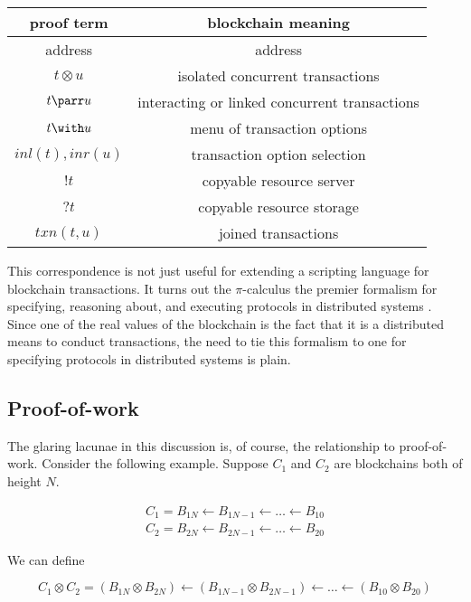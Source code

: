 \documentclass[]{acm_proc_article-sp}
\numberwithin{equation}{subsection}
\begin{document}
\begin{tabular}{c|c}
  proof term & blockchain meaning \\
  \hline
  address & address \\
  $t \otimes u$ & isolated concurrent transactions \\
  $t \parr u$ & interacting or linked concurrent transactions \\
  $t \with u$ & menu of transaction options \\
  $inl( t ), inr( u )$ & transaction option selection \\
  $!t$ & copyable resource server \\
  $?t$ & copyable resource storage \\
  $txn( t, u )$ & joined transactions\\
\end{tabular}

This correspondence is not just useful for extending a scripting
language for blockchain transactions. It turns out the
{$\pi$}-calculus the premier formalism for specifying, reasoning
about, and executing protocols in distributed systems
\cite{milner91polyadicpi} \cite{DBLP:journals/mscs/Milner92}
\cite{DBLP:conf/aplas/AbadiCF06} \cite{DBLP:journals/tissec/AbadiBF07}
\cite{DBLP:conf/lics/Gordon06} \cite{DBLP:conf/esop/KremerR05}. Since
one of the real values of the blockchain is the fact that it is a
distributed means to conduct transactions, the need to tie this
formalism to one for specifying protocols in distributed systems is
plain.

\subsection{Proof-of-work}

The glaring lacunae in this discussion is, of course, the relationship
to proof-of-work. Consider the following example. Suppose $C_1$ and $C_2$
are blockchains both of height $N$.

\begin{equation*}
  \begin{aligned}
    C_1 = B_{1N} \leftarrow B_{1N-1} \leftarrow \ldots \leftarrow B_{10} \\
    C_2 = B_{2N} \leftarrow B_{2N-1} \leftarrow \ldots \leftarrow B_{20}
  \end{aligned}
\end{equation*}

We can define

\begin{equation*}
  C_1 \otimes C_2 = ( B_{1N} \otimes B_{2N} ) \leftarrow ( B_{1N-1} \otimes B_{2N-1} ) \leftarrow \ldots \leftarrow ( B_{10} \otimes B_{20} )
\end{equation*}
\end{document}
